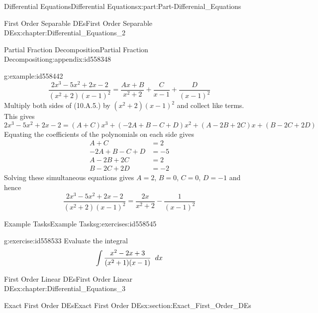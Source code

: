 \documentclass[oneside,10pt,]{book}
\numberwithin{equation}{section}
\newcommand{\amp}{&}
\begin{document}
\begin{partptx}{Differential Equations}{}{Differential Equations}{}{}{x:part:Part-Differenial_Equations}
\begin{chapterptx}{First Order Separable DEs}{}{First Order Separable DEs}{}{}{x:chapter:Differential_Equations_2}
\begin{appendixptx}{Partial Fraction Decomposition}{}{Partial Fraction Decomposition}{}{}{g:appendix:id558348}
\begin{example}{}{g:example:id558442}
\begin{equation}
\frac{2x^3-5x^2+2x-2}{(x^2+2)(x-1)^2}=\frac{Ax+B}{x^2+2}+\frac{C}{x-1}+\frac{D}{(x-1)^2}\label{g:men:id558483}
\end{equation}
Multiply both sides of (10.A.5.) by \((x^2+2)(x-1)^2\) and collect like terms. This gives%
\begin{equation*}
2x^3-5x^2+2x-2=(A+C)x^3+(-2A+B-C+D)x^2+(A-2B+2C)x+(B-2C+2D)
\end{equation*}
Equating the coefficients of the polynomials on each side gives %
\begin{align*}
A+C \amp =2\\
-2A+B-C+D \amp=-5\\
A-2B+2C \amp =2\\
B-2C+2D \amp=-2
\end{align*}
%
 Solving these simultaneous equations gives \(A=2\), \(B=0\), \(C=0\), \(D=-1\) and hence%
\begin{equation*}
\frac{2x^3-5x^2+2x-2}{(x^2+2)(x-1)^2}=\frac{2x}{x^2+2}-\frac{1}{(x-1)^2}
\end{equation*}
%
\end{example}
%
%
\typeout{************************************************}
\typeout{************************************************}
%
\begin{exercises-section-numberless}{Example Tasks}{}{Example Tasks}{}{}{g:exercises:id558545}
\begin{divisionexercise}{1}{}{}{g:exercise:id558533}%
Evaluate the integral%
\begin{equation*}
\int \frac{x^2-2x+3}{(x^2+1)(x-1)}\hspace{2mm} dx
\end{equation*}
%
\end{divisionexercise}%
\end{exercises-section-numberless}
\end{appendixptx}
\end{chapterptx}
%
\typeout{************************************************}
\typeout{************************************************}
%
\begin{chapterptx}{First Order Linear DEs}{}{First Order Linear DEs}{}{}{x:chapter:Differential_Equations_3}
%
%
\typeout{************************************************}
\typeout{************************************************}
%
\begin{sectionptx}{Exact First Order DEs}{}{Exact First Order DEs}{}{}{x:section:Exact_First_Order_DEs}

\end{sectionptx}
\end{chapterptx}
\end{partptx}
\end{document}

